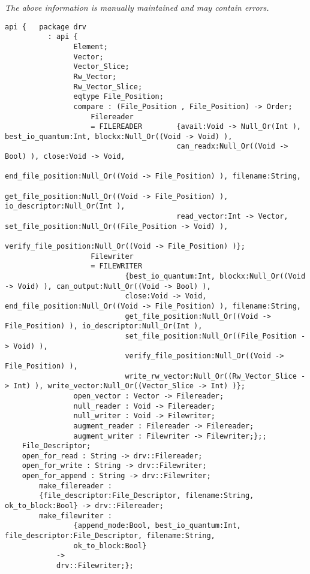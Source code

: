 \label{api:Winix\_Extended\_File\_Io\_Driver\_For\_Os\_\_Premicrothread}

{\tiny \it The above information is manually maintained and may contain errors.}
\begin{verbatim}
api {   package drv
          : api {
                Element;
                Vector;
                Vector_Slice;
                Rw_Vector;
                Rw_Vector_Slice;
                eqtype File_Position;
                compare : (File_Position , File_Position) -> Order;
                    Filereader
                    = FILEREADER        {avail:Void -> Null_Or(Int ), best_io_quantum:Int, blockx:Null_Or((Void -> Void) ),
                                        can_readx:Null_Or((Void -> Bool) ), close:Void -> Void,
                                        end_file_position:Null_Or((Void -> File_Position) ), filename:String,
                                        get_file_position:Null_Or((Void -> File_Position) ), io_descriptor:Null_Or(Int ),
                                        read_vector:Int -> Vector, set_file_position:Null_Or((File_Position -> Void) ),
                                        verify_file_position:Null_Or((Void -> File_Position) )};
                    Filewriter
                    = FILEWRITER
                            {best_io_quantum:Int, blockx:Null_Or((Void -> Void) ), can_output:Null_Or((Void -> Bool) ),
                            close:Void -> Void, end_file_position:Null_Or((Void -> File_Position) ), filename:String,
                            get_file_position:Null_Or((Void -> File_Position) ), io_descriptor:Null_Or(Int ),
                            set_file_position:Null_Or((File_Position -> Void) ),
                            verify_file_position:Null_Or((Void -> File_Position) ),
                            write_rw_vector:Null_Or((Rw_Vector_Slice -> Int) ), write_vector:Null_Or((Vector_Slice -> Int) )};
                open_vector : Vector -> Filereader;
                null_reader : Void -> Filereader;
                null_writer : Void -> Filewriter;
                augment_reader : Filereader -> Filereader;
                augment_writer : Filewriter -> Filewriter;};;
    File_Descriptor;
    open_for_read : String -> drv::Filereader;
    open_for_write : String -> drv::Filewriter;
    open_for_append : String -> drv::Filewriter;
        make_filereader :
        {file_descriptor:File_Descriptor, filename:String, ok_to_block:Bool} -> drv::Filereader;
        make_filewriter :
                {append_mode:Bool, best_io_quantum:Int, file_descriptor:File_Descriptor, filename:String,
                ok_to_block:Bool}
            ->
            drv::Filewriter;};
\end{verbatim}
